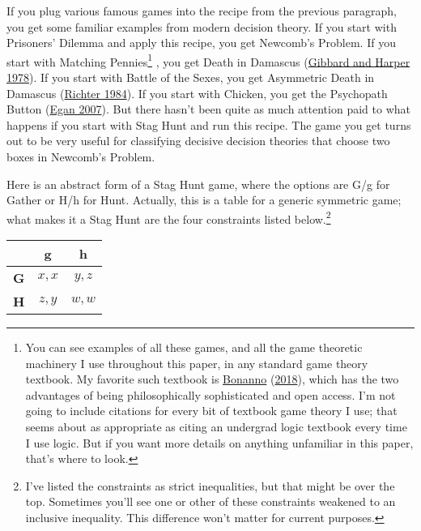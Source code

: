 \documentclass[
  12pt,
]{article}
\begin{document}
If you plug various famous games into the recipe from the previous
paragraph, you get some familiar examples from modern decision theory.
If you start with Prisoners' Dilemma and apply this recipe, you get
Newcomb's Problem. If you start with Matching Pennies\footnote{You can
  see examples of all these games, and all the game theoretic machinery
  I use throughout this paper, in any standard game theory textbook. My
  favorite such textbook is \protect\hyperlink{ref-Bonanno2018}{Bonanno}
  (\protect\hyperlink{ref-Bonanno2018}{2018}), which has the two
  advantages of being philosophically sophisticated and open access. I'm
  not going to include citations for every bit of textbook game theory I
  use; that seems about as appropriate as citing an undergrad logic
  textbook every time I use logic. But if you want more details on
  anything unfamiliar in this paper, that's where to look.} , you get
Death in Damascus (\protect\hyperlink{ref-GibbardHarper1978}{Gibbard and
Harper 1978}). If you start with Battle of the Sexes, you get Asymmetric
Death in Damascus (\protect\hyperlink{ref-Richter1984}{Richter 1984}).
If you start with Chicken, you get the Psychopath Button
(\protect\hyperlink{ref-Egan2007-EGASCT}{Egan 2007}). But there hasn't
been quite as much attention paid to what happens if you start with Stag
Hunt and run this recipe. The game you get turns out to be very useful
for classifying decisive decision theories that choose two boxes in
Newcomb's Problem.

Here is an abstract form of a Stag Hunt game, where the options are G/g
for Gather or H/h for Hunt. Actually, this is a table for a generic
symmetric game; what makes it a Stag Hunt are the four constraints
listed below.\footnote{I've listed the constraints as strict
  inequalities, but that might be over the top. Sometimes you'll see one
  or other of these constraints weakened to an inclusive inequality.
  This difference won't matter for current purposes.}

\begin{table}[H]
\centering
\begin{tabular}[t]{>{}r|cc}

\textbf{ } & \textbf{g} & \textbf{h}\\
\midrule
\textbf{G} & $x, x$ & $y, z$\\
\textbf{H} & $z, y$ & $w, w$\\

\end{tabular}
\end{table}
\end{document}
